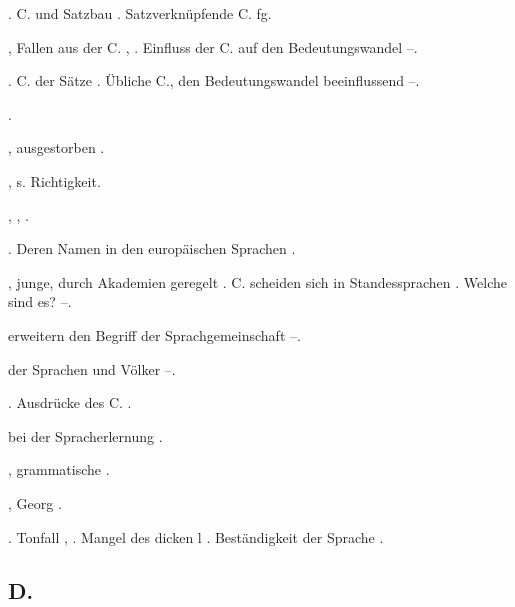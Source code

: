 \begin{register}
 \pageref{sp.104}. C. und Satzbau \pageref{sp.418}. Satzverknüpfende C. \pageref{sp.465} f\pageref{sp.1}g. 

, Fallen aus der C. \pageref{sp.43}, \pageref{sp.182}. Einfluss der C. auf den Bedeutungswandel \pageref{sp.234}–\pageref{sp.236}.

 \pageref{sp.101}. C. der Sätze \pageref{sp.104}. Übliche C., den Bedeutungswandel beeinflussend \pageref{sp.234}–\pageref{sp.236}.

 \pageref{sp.102}.



, ausgestorben \pageref{sp.146}.


, s. Richtigkeit.

 \pageref{sp.158}, \pageref{sp.182}, \pageref{sp.279}.


. Deren Namen in den europäischen Sprachen \pageref{sp.297}.

, junge, durch Akademien geregelt \pageref{sp.126}. C. scheiden sich in Standessprachen \pageref{sp.288}. Welche sind es? \pageref{sp.388}–\pageref{sp.389}.

 erweitern den Begriff der Sprachgemeinschaft \pageref{sp.57}–\pageref{sp.58}.

 der Sprachen und Völker \pageref{sp.388}–\pageref{sp.389}.

. Ausdrücke des C. \pageref{sp.107}.

 bei der Spracherlernung \pageref{sp.78}.

, grammatische \pageref{sp.111}.

, Georg \pageref{sp.80}. 


. Tonfall \pageref{sp.34}, \pageref{sp.431}. Mangel des dicken l \pageref{sp.269}. Beständigkeit der Sprache \pageref{sp.428}.

\subsection*{D.}\label{reg.D}


\end{register}
